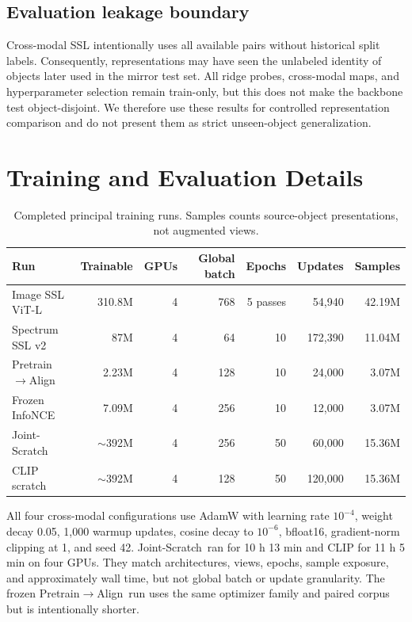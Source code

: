 \documentclass{article}
\newcommand{\prealign}{Pretrain$\rightarrow$Align}
\newcommand{\joint}{Joint-Scratch}
\begin{document}
\subsection{Evaluation leakage boundary}

Cross-modal SSL intentionally uses all available pairs without historical
split labels.
Consequently, representations may have seen the unlabeled identity of objects
later used in the mirror test set.
All ridge probes, cross-modal maps, and hyperparameter selection remain
train-only, but this does not make the backbone test object-disjoint.
We therefore use these results for controlled representation comparison and do
not present them as strict unseen-object generalization.

\FloatBarrier
\section{Training and Evaluation Details}
\label{app:training}

\begin{table}[h]
\centering
\caption{Completed principal training runs. Samples counts source-object
presentations, not augmented views.}
\label{tab:training_runs}
\scriptsize
\setlength{\tabcolsep}{3.3pt}
\begin{tabular}{lrrrrrr}
\toprule
Run & Trainable & GPUs & Global batch & Epochs & Updates & Samples\\
\midrule
Image SSL ViT-L & 310.8M & 4 & 768 & 5 passes & 54,940 & 42.19M\\
Spectrum SSL v2 & 87M & 4 & 64 & 10 & 172,390 & 11.04M\\
\prealign & 2.23M & 4 & 128 & 10 & 24,000 & 3.07M\\
Frozen InfoNCE & 7.09M & 4 & 256 & 10 & 12,000 & 3.07M\\
\joint & $\sim$392M & 4 & 256 & 50 & 60,000 & 15.36M\\
CLIP scratch & $\sim$392M & 4 & 128 & 50 & 120,000 & 15.36M\\
\bottomrule
\end{tabular}
\end{table}

All four cross-modal configurations use AdamW with learning rate $10^{-4}$, weight decay
0.05, 1,000 warmup updates, cosine decay to $10^{-6}$, bfloat16, gradient-norm
clipping at 1, and seed 42.
\joint\ ran for 10 h 13 min and CLIP for 11 h 5 min on four GPUs.
They match architectures, views, epochs, sample exposure, and approximately
wall time, but not global batch or update granularity.
The frozen \prealign\ run uses the same optimizer family and paired corpus but
is intentionally shorter.
\end{document}
